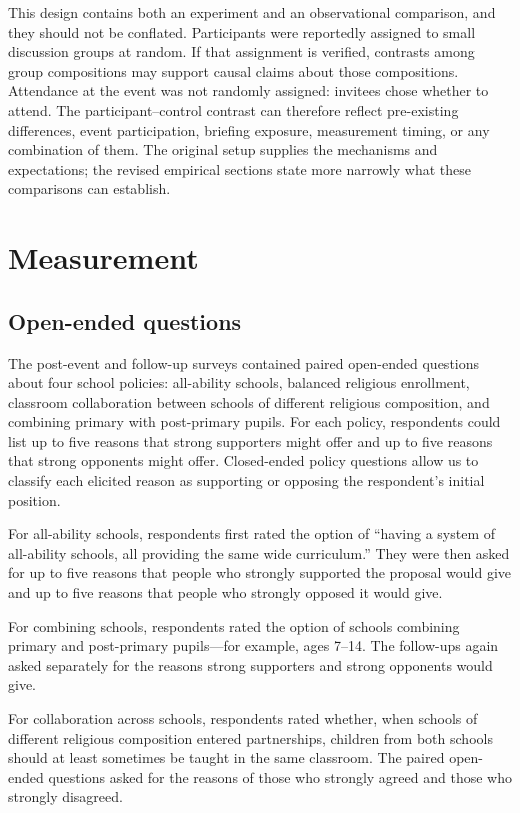 \documentclass[11pt]{article}
\begin{document}
This design contains both an experiment and an observational comparison, and they should not
be conflated. Participants were reportedly assigned to small discussion groups at random. If
that assignment is verified, contrasts among group compositions may support causal claims
about those compositions. Attendance at the event was not randomly assigned: invitees chose
whether to attend. The participant--control contrast can therefore reflect pre-existing
differences, event participation, briefing exposure, measurement timing, or any combination of
them. The original setup supplies the mechanisms and expectations; the revised empirical
sections state more narrowly what these comparisons can establish.

\section{Measurement}

\subsection{Open-ended questions}

The post-event and follow-up surveys contained paired open-ended questions about four school
policies: all-ability schools, balanced religious enrollment, classroom collaboration between
schools of different religious composition, and combining primary with post-primary pupils.
For each policy, respondents could list up to five reasons that strong supporters might offer
and up to five reasons that strong opponents might offer. Closed-ended policy questions allow
us to classify each elicited reason as supporting or opposing the respondent's initial position.

For all-ability schools, respondents first rated the option of ``having a system of all-ability
schools, all providing the same wide curriculum.'' They were then asked for up to five reasons
that people who strongly supported the proposal would give and up to five reasons that people
who strongly opposed it would give.

For combining schools, respondents rated the option of schools combining primary and
post-primary pupils---for example, ages 7--14. The follow-ups again asked separately for the
reasons strong supporters and strong opponents would give.

For collaboration across schools, respondents rated whether, when schools of different
religious composition entered partnerships, children from both schools should at least
sometimes be taught in the same classroom. The paired open-ended questions asked for the
reasons of those who strongly agreed and those who strongly disagreed.
\end{document}
